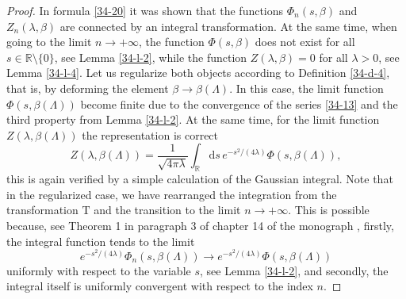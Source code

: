 \documentclass[a4paper]{article}
\begin{document}
\begin{proof} In formula \eqref{34-20} it was shown that the functions $\Phi_n(s,\beta)$ and $Z_n(\lambda,\beta)$ are connected by an integral transformation. At the same time, when going to the limit $n\to+\infty$, the function $\Phi(s,\beta)$ does not exist for all $s\in\mathbb{R}\setminus\{0\}$, see Lemma \ref{34-l-2}, while the function $Z(\lambda,\beta)=0$ for all $\lambda>0$, see Lemma \ref{34-l-4}. Let us regularize both objects according to Definition \ref{34-d-4}, that is, by deforming the element $\beta\to\beta(\Lambda)$. In this case, the limit function $\Phi(s,\beta(\Lambda))$ become finite due to the convergence of the series \eqref{34-13} and the third property from Lemma \ref{34-l-2}. At the same time, for the limit function $Z(\lambda,\beta(\Lambda))$ the representation is correct
\begin{equation}\label{34-27}
Z(\lambda,\beta(\Lambda))=\frac{1}{\sqrt{4\pi\lambda}}
\int_{\mathbb{R}}\mathrm{d}s\,e^{-s^2/(4\lambda)}\Phi(s,\beta(\Lambda)),
\end{equation}
this is again verified by a simple calculation of the Gaussian integral. Note that in the regularized case, we have rearranged the integration from the transformation $\mathrm{T}$ and the transition to the limit $n\to+\infty$. This is possible because, see Theorem 1 in paragraph 3 of chapter 14 of the monograph \cite{34-f-1}, firstly, the integral function tends to the limit
\begin{equation*}
e^{-s^2/(4\lambda)}\Phi_n(s,\beta(\Lambda))\to
e^{-s^2/(4\lambda)}\Phi(s,\beta(\Lambda))
\end{equation*}
uniformly with respect to the variable $s$, see Lemma \ref{34-l-2}, and secondly, the integral itself is uniformly convergent with respect to the index $n$.


\end{proof}
\end{document}
